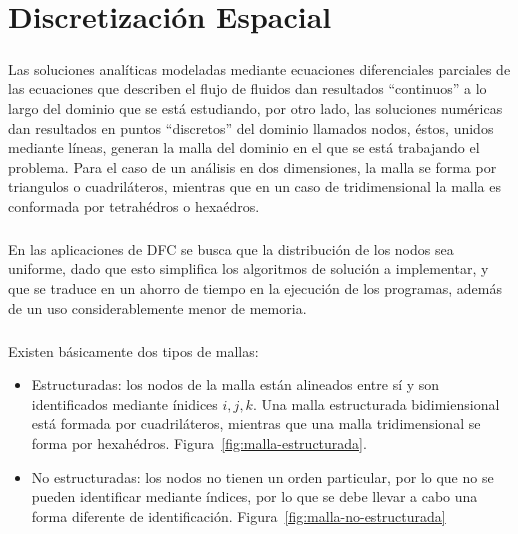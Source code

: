 \documentclass[letterpaper, openright, 12pt]{book}
\begin{document}
	\chapter{Discretización Espacial} \label{chap:discretizacion-espacial}
	\paragraph*{}
	Las soluciones analíticas modeladas mediante ecuaciones diferenciales
    parciales de las ecuaciones que describen el flujo de fluidos dan resultados
    ``continuos'' a lo largo del dominio que se está estudiando, por otro lado,
    las soluciones numéricas  dan resultados en puntos ``discretos'' del dominio
    llamados nodos, éstos, unidos mediante líneas, generan la malla del dominio
    en el que se está trabajando el problema. Para el caso de un análisis en dos
    dimensiones, la malla se forma por triangulos o cuadriláteros, mientras que
    en un caso de tridimensional la malla es conformada por tetrahédros o hexaédros.
	
	\paragraph*{}
	En las aplicaciones de DFC se busca que la distribución de los nodos sea
    uniforme, dado que esto simplifica los algoritmos de solución a implementar,
    y que se traduce en un ahorro de tiempo en la ejecución de los programas,
    además de un uso considerablemente menor de memoria.
	
	\paragraph*{}
	Existen básicamente dos tipos de mallas:
	\begin{itemize}
	\item Estructuradas: los nodos de la malla están alineados entre sí y
      son identificados mediante ínidices $i, j, k$. Una malla estructurada
      bidimiensional está formada por cuadriláteros, mientras que una malla
      tridimensional se forma por hexahédros. Figura~\ref{fig:malla-estructurada}.
	\item No estructuradas: los nodos no tienen un orden particular, por lo
      que no se pueden identificar mediante índices, por lo que se debe llevar a
      cabo una forma diferente de identificación. Figura~\ref{fig:malla-no-estructurada}
	\end{itemize}
\end{document}

